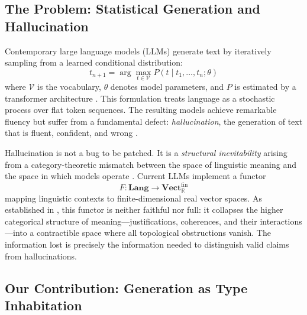 \documentclass[11pt,a4paper]{article}
\theoremstyle{plain}
\theoremstyle{definition}
\theoremstyle{remark}
\newcommand{\Lang}{\mathbf{Lang}}
\newcommand{\Vect}{\mathbf{Vect}}
\begin{document}
\subsection{The Problem: Statistical Generation and Hallucination}

Contemporary large language models (LLMs) generate text by iteratively sampling from a learned conditional distribution:
\begin{equation}\label{eq:standard-gen}
  t_{n+1} = \arg\max_{t \in \mathcal{V}} P(t \mid t_1, \ldots, t_n; \theta)
\end{equation}
where $\mathcal{V}$ is the vocabulary, $\theta$ denotes model parameters, and $P$ is estimated by a transformer architecture \cite{vaswani2017attention}.
This formulation treats language as a stochastic process over flat token sequences.
The resulting models achieve remarkable fluency but suffer from a fundamental defect: \emph{hallucination}, the generation of text that is fluent, confident, and wrong \cite{ji2023survey, huang2023survey}.

Hallucination is not a bug to be patched.
It is a \emph{structural inevitability} arising from a category-theoretic mismatch between the space of linguistic meaning and the space in which models operate \cite{long2026homotopical}.
Current LLMs implement a functor
\begin{equation}\label{eq:lossy-functor}
  F : \Lang \to \Vect_{\mathbb{R}}^{\mathrm{fin}}
\end{equation}
mapping linguistic contexts to finite-dimensional real vector spaces.
As established in \cite{long2026hhc}, this functor is neither faithful nor full: it collapses the higher categorical structure of meaning---justifications, coherences, and their interactions---into a contractible space where all topological obstructions vanish.
The information lost is precisely the information needed to distinguish valid claims from hallucinations.

\subsection{Our Contribution: Generation as Type Inhabitation}
\end{document}
